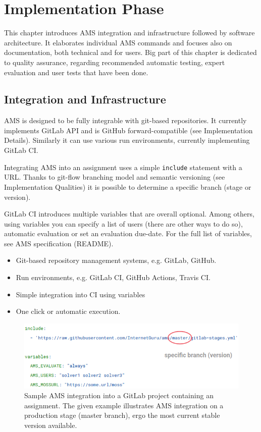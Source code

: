 \chapter{Implementation Phase} \label{chap:implementation}

{This chapter introduces AMS integration and infrastructure followed by software architecture. It elaborates individual AMS commands and focuses also on documentation, both technical and for users. Big part of this chapter is dedicated to quality assurance, regarding recommended automatic testing, expert evaluation and user tests that have been done.}

\section{Integration and Infrastructure}\label{sec:intandinf}

{AMS is designed to be fully integrable with git-based repositories. It currently implements GitLab API and is GitHub forward-compatible (see Implementation Details). Similarly it can use various run environments, currently implementing GitLab CI.}

{Integrating AMS into an assignment uses a simple \texttt{include} statement with a URL. Thanks to git-flow branching model and semantic versioning (see Implementation Qualities) it is possible to determine a specific branch (stage or version).}

{GitLab CI introduces multiple variables that are overall optional. Among others, using variables you can specify a list of users (there are other ways to do so), automatic evaluation or set an evaluation due-date. For the full list of variables, see AMS specification (README).}

\begin{itemize}
\item
  {Git-based repository management systems, e.g. GitLab, GitHub.}
\item
  {Run environments, e.g. GitLab CI, GitHub Actions, Travis CI.}
\item
  {Simple integration into CI using variables}
\item
  {One click or automatic execution.}
\end{itemize}

\begin{figure}[H]
    \centering
    \includegraphics[width=\textwidth,height=\textheight,keepaspectratio]{Figures/impl/image7.png}
    \caption[Sample AMS integration into a GitLab project]{Sample AMS integration into a GitLab project containing an assignment. The given example illustrates AMS integration on a production stage (master branch), ergo the most current stable version available.}
\end{figure}

